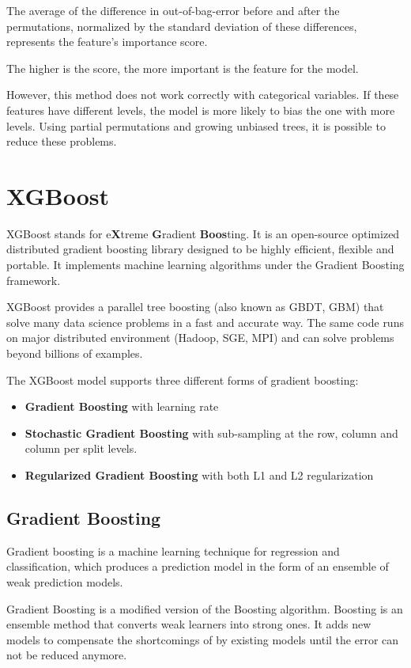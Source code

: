 The average of the difference in out-of-bag-error before and after the permutations, normalized by the standard deviation of these differences, represents the feature's importance score.

The higher is the score, the more important is the feature for the model.

However, this method does not work correctly with categorical variables. If these features have different levels, the model is more likely to bias the one with more levels. Using partial permutations and growing unbiased trees, it is possible to reduce these problems. \cite{deng2011bias}

\section{XGBoost}
XGBoost stands for e\textbf{X}treme \textbf{G}radient \textbf{Boos}ting. It is an open-source optimized distributed gradient boosting library designed to be highly efficient, flexible and portable. It implements machine learning algorithms under the Gradient Boosting framework. 

XGBoost provides a parallel tree boosting (also known as GBDT, GBM) that solve many data science problems in a fast and accurate way. The same code runs on major distributed environment (Hadoop, SGE, MPI) and can solve problems beyond billions of examples. \cite{xgboost}

The XGBoost model supports three different forms of gradient boosting: \cite{gentleXgboost}
\begin{itemize}
	\item \textbf{Gradient Boosting} with learning rate
	\item \textbf{Stochastic Gradient Boosting} with sub-sampling at the row, column and column per split levels.
	\item \textbf{Regularized Gradient Boosting} with both L1 and L2 regularization
\end{itemize} 

\subsection{Gradient Boosting}

Gradient boosting is a machine learning technique for regression and classification, which produces a prediction model in the form of an ensemble of weak prediction models. 

Gradient Boosting is a modified version of the Boosting algorithm.
Boosting is an ensemble method that converts weak learners into strong ones. It adds new models to compensate the shortcomings of by existing models until the error can not be reduced anymore. \cite{zhou2012ensemble}

